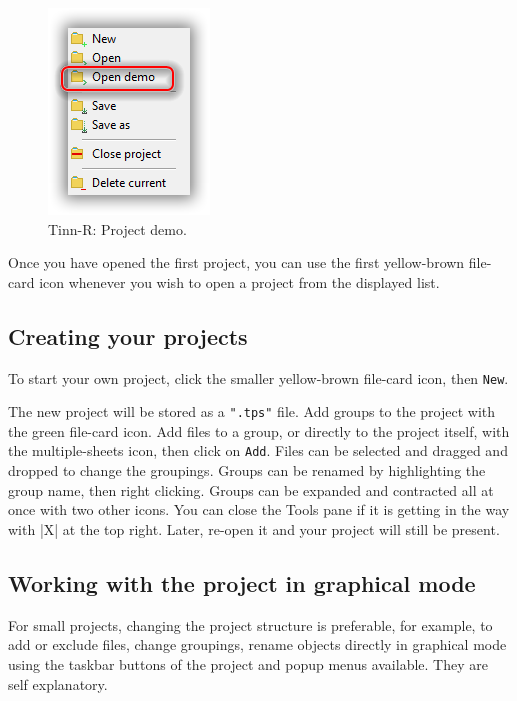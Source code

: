 \begin{figure}[H]
  \begin{center}
    \includegraphics[scale=0.60]{./res/projects_open_demo.png}
  \end{center}
  \caption{Tinn-R: Project demo.}
  \label{fig:tinn-r_projects_open_demo}
\end{figure}

Once you have opened the first project, you can use the first
yellow-brown file-card icon whenever you wish to open a project from the displayed list. 

\subsection{Creating your projects}
To start your own project, click the smaller yellow-brown file-card icon, then \texttt{New}.

The new project will be stored as a \texttt{".tps"} file. Add groups to the project with the green file-card icon.
Add files to a group, or directly to the project itself, with the multiple-sheets icon, then click on \texttt{Add}. 
Files can be selected and dragged and dropped to change the groupings. Groups can be renamed by highlighting 
the group name, then right clicking. Groups can be expanded and contracted all at once with two other icons. 
You can close the Tools pane if it is getting in the way with |X| at the top right.  
Later, re-open it and your project will still be present.

\subsection{Working with the project in graphical mode}
For small projects, changing the project structure is preferable, for example, to add or exclude files, 
change groupings, rename objects directly in graphical mode using the taskbar buttons of the project
and popup menus available. They are self explanatory.

